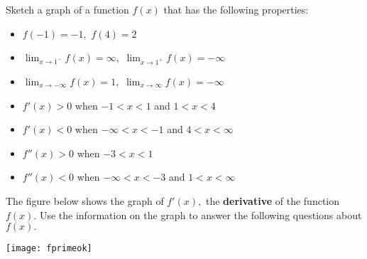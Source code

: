 \documentclass[addpoints,12pt]{exam}
\begin{document}
\begin{questions}

\newpage




\question[12]

Sketch a graph of a function $f(x)$ that has the following properties:

\begin{itemize}
\item $f(-1)=-1,$ $f(4) = 2$
\item $\displaystyle\lim_{x\to 1^{-}}f(x) = \infty,$ $\displaystyle\lim_{x\to 1^{+}}f(x) = -\infty$
\item $\displaystyle\lim_{x\to -\infty} f(x) = 1,$ $\displaystyle\lim_{x\to \infty}f(x) = -\infty$
\item $f'(x)>0$ when $-1<x<1$ and $1<x<4$
\item $f'(x)<0$ when $-\infty<x<-1$ and $4<x<\infty$
\item $f''(x)>0$ when $-3<x<1$
\item $f''(x)<0$ when $-\infty<x<-3$ and $1<x<\infty$

\end{itemize}


\begin{center}

\end{center}

\newpage




\question The figure below shows the graph of
$f'(x),$ the \textbf{derivative} of the function $f(x).$ Use the information on the graph to answer
the following questions about $f(x).$


\begin{center}
\texttt{[image: fprimeok]}

\end{center}




\end{questions}
\end{document}
